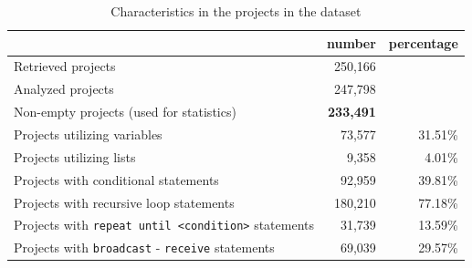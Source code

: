 \documentclass{sig-alternate}
\begin{document}
\begin{table}[ht]
	\centering
	\begin{tabular}{lrr}
		\hline
		&\textbf{number}&\textbf{percentage}\\
		\hline
		Retrieved projects & 250,166 & \\
		Analyzed projects & 247,798 & \\
		Non-empty projects (used for statistics) & \textbf{233,491} & \\

		Projects utilizing variables & 73,577 & 31.51\% \\
		Projects utilizing lists & 9,358 & 4.01\% \\
		Projects with conditional statements & 92,959 & 39.81\% \\
		Projects with recursive loop statements & 180,210 & 77.18\% \\
		Projects with \texttt{repeat until <condition>} statements & 31,739 & 13.59\% \\
		Projects with \texttt{broadcast} - \texttt{receive} statements & 69,039 & 29.57\%\\
		\hline
	\end{tabular}
	\caption{Characteristics in the projects in the dataset}
	\label{tbl-characteristics}
\end{table}
\end{document}

